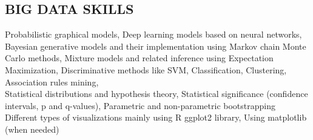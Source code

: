 \documentclass[margin, 10pt]{res} %
\begin{document}
\begin{resume}
\section{BIG DATA SKILLS}
{\bf \color{Brown}{Machine Learning Skills:}} 
Probabilistic graphical models, Deep learning models based on neural networks, Bayesian generative models and their implementation using Markov chain Monte Carlo methods, Mixture models and related inference using Expectation Maximization, Discriminative methods like SVM, Classification, Clustering, Association rules mining,   \\
{\bf \color{Brown}{Statistical Theory:}} Statistical distributions and hypothesis theory, Statistical significance (confidence intervals, p and q-values), Parametric and non-parametric bootstrapping \\
{\bf \color{Brown}{Statistical Visualization and reporting:}} Different types of visualizations mainly using R ggplot2 library, Using matplotlib (when needed)



\end{resume}
\end{document}
